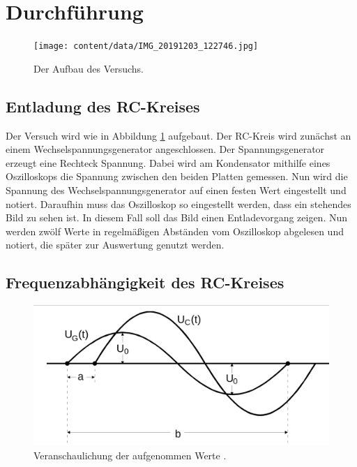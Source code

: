 \section{Durchführung}
\label{sec:Durchführung}
\begin{figure}
    \centering
    \texttt{[image: content/data/IMG\_20191203\_122746.jpg]}
    \caption{Der Aufbau des Versuchs.}
    \label{fig:aufbau}
\end{figure}

\subsection{Entladung des RC-Kreises}
\label{sec:1}
Der Versuch wird wie in Abbildung \ref{fig:aufbau} aufgebaut.
Der RC-Kreis wird zunächst an einem Wechselspannungsgenerator angeschlossen.
Der Spannungsgenerator erzeugt eine Rechteck Spannung.
Dabei wird am Kondensator mithilfe eines Oszilloskops die Spannung zwischen den beiden Platten gemessen.
Nun wird die Spannung des Wechselspannungsgenerator auf einen festen Wert eingestellt und notiert.
Daraufhin muss das Oszilloskop so eingestellt werden, dass ein stehendes Bild zu sehen ist. In diesem Fall soll das Bild einen Entladevorgang zeigen.
Nun werden zwölf Werte in regelmäßigen Abständen vom Oszilloskop abgelesen und notiert, die später zur Auswertung genutzt werden.
\FloatBarrier

\subsection{Frequenzabhängigkeit des RC-Kreises}
\begin{figure}
    \centering
    \includegraphics[width=\textwidth]{content/data/a_und_b.jpg}
    \caption{Veranschaulichung der aufgenommen Werte \cite[S.282]{anleitung}.}
    \label{fig:a_und_b}
\end{figure}

